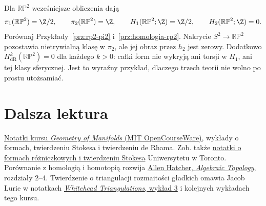 \begin{przyklad}
Dla $\mathbb{RP}^2$ wcześniejsze obliczenia dają
\[
 \pi_1(\mathbb{RP}^2)=\Z/2,\qquad
 \pi_2(\mathbb{RP}^2)=\Z,\qquad
 H_1(\mathbb{RP}^2;\Z)=\Z/2,\qquad
 H_2(\mathbb{RP}^2;\Z)=0.
\]
Porównaj Przykłady~\ref{prz:rp2-pi2}
i~\ref{prz:homologia-rp2}. Nakrycie
$S^2\to\mathbb{RP}^2$ pozostawia nietrywialną
klasę w $\pi_2$, ale jej obraz przez $h_2$
jest zerowy. Dodatkowo
$H^k_{\mathrm{dR}}(\mathbb{RP}^2)=0$
dla każdego $k>0$: całki form nie wykryją
ani torsji w $H_1$, ani tej klasy sferycznej.
Jest to wyraźny przykład, dlaczego trzech teorii
nie wolno po prostu utożsamiać.
\end{przyklad}

\section*{Dalsza lektura}
\href{https://ocw.mit.edu/courses/18-965-geometry-of-manifolds-fall-2004/pages/lecture-notes/}
{Notatki kursu \emph{Geometry of Manifolds} (MIT OpenCourseWare)},
wykłady o formach, twierdzeniu Stokesa i twierdzeniu de Rhama.
Zob. także \href{https://www.math.toronto.edu/mgualt/courses/17-1300/docs/17-1300-notes-13.pdf}
{notatki o formach różniczkowych i twierdzeniu Stokesa}
Uniwersytetu w Toronto.
Porównanie z homologią i homotopią rozwija
\href{https://pi.math.cornell.edu/~hatcher/AT/AT.pdf}
{Allen Hatcher, \emph{Algebraic Topology}},
rozdziały 2--4. Twierdzenie o triangulacji rozmaitości
gładkich omawia Jacob Lurie w notatkach
\href{https://www.math.ias.edu/~lurie/937notes/937Lecture3.pdf}
{\emph{Whitehead Triangulations}, wykład 3} i kolejnych
wykładach tego kursu.


